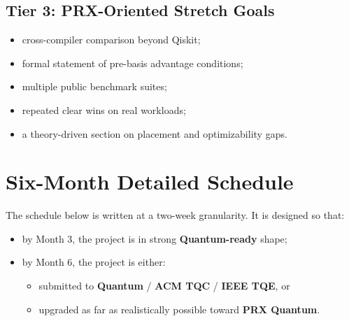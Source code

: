 \documentclass[11pt]{article}
\begin{document}
\subsection{Tier 3: PRX-Oriented Stretch Goals}
\begin{itemize}
    \item cross-compiler comparison beyond Qiskit;
    \item formal statement of pre-basis advantage conditions;
    \item multiple public benchmark suites;
    \item repeated clear wins on real workloads;
    \item a theory-driven section on placement and optimizability gaps.
\end{itemize}

\section{Six-Month Detailed Schedule}

\noindent
The schedule below is written at a two-week granularity. It is designed so that:
\begin{itemize}
    \item by Month 3, the project is in strong \textbf{Quantum-ready} shape;
    \item by Month 6, the project is either:
    \begin{itemize}
        \item submitted to \textbf{Quantum} / \textbf{ACM TQC} / \textbf{IEEE TQE}, or
        \item upgraded as far as realistically possible toward \textbf{PRX Quantum}.
    \end{itemize}
\end{itemize}
\end{document}
